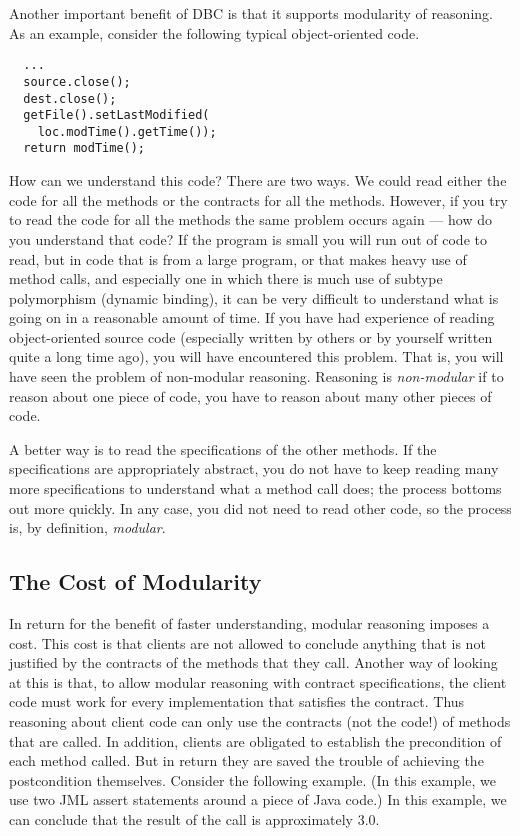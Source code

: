 \documentclass{jotarticle}
\begin{document}
Another important benefit of DBC is that it supports modularity of
reasoning.
As an example, consider the following typical object-oriented code.

\begin{verbatim}
  ...
  source.close();
  dest.close();
  getFile().setLastModified(
    loc.modTime().getTime());
  return modTime();
\end{verbatim}

How can we understand this code?  There are
two ways. We could read either the code for all the methods or the
contracts for all the methods.
However, if you try to read the code for all the methods the same
problem occurs again --- how do you understand that code?
If the program is small you will run out of code to read, but in code
that is from a large program, or that makes heavy use of method calls, and
especially one in which there is much use of subtype polymorphism
(dynamic binding), it can be very difficult to understand what is
going on in a reasonable amount of time.
If you have had experience of reading object-oriented source code
(especially written by others or by yourself written quite a long time
ago), you will have encountered this problem.  That is, you will have
seen the problem of non-modular reasoning.  Reasoning is
\emph{non-modular\/} if to reason about one piece of code, you have to
reason about many other pieces of code.

A better way is to read the specifications of the other methods.
If the specifications are appropriately abstract, you do not have to
keep reading many more specifications to understand what a method call
does; the process bottoms out more quickly.  In any case, you did not
need to read other code, so the process is, by definition, \emph{modular}.

\subsection{The Cost of Modularity}

In return for the benefit of faster understanding, modular reasoning
imposes a cost.  This cost is that clients are not allowed to conclude
anything that is not justified by the contracts of the methods that
they call.  Another way of looking at this is that,
to allow modular reasoning with contract specifications, the
client code must work for every implementation that satisfies
the contract.  Thus reasoning about client code can only use the
contracts (not the code!) of methods that are called.
In addition, clients are obligated to establish the precondition of
each method called.  But in return they are saved the trouble of
achieving the postcondition themselves.  Consider the following
example.  (In this example, we use two JML assert statements around a
piece of Java code.)  In this example, we can conclude that the result
of the call is approximately 3.0.
\end{document}
